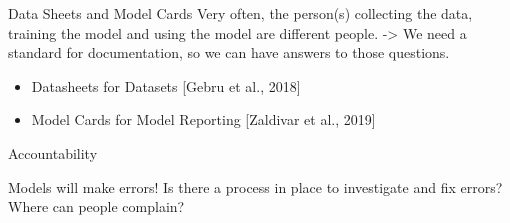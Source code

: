 \begin{vbframe}{Data Sheets and Model Cards}
Very often, the person(s) collecting the data, training the model and using the model are different people. 
-> We need a standard for documentation, so we can have answers to those questions.
\begin{itemize}
\item Datasheets for Datasets [Gebru et al., 2018]
\item Model Cards for Model Reporting [Zaldivar et al., 2019]
\end{itemize}

\end{vbframe}
\begin{vbframe}{Accountability}

Models will make errors! Is there a process in place to investigate and fix errors? Where can people complain?

\end{vbframe}

\endlecture

